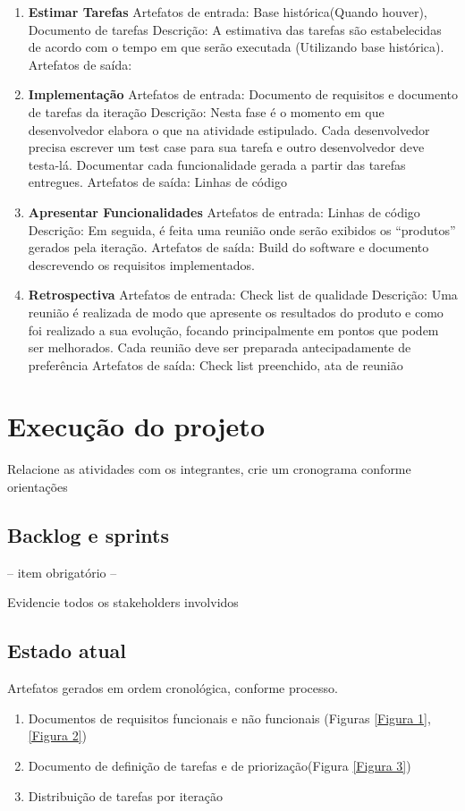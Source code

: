 \documentclass[	DIV=calc,%
							paper=a4,%
							fontsize=12pt,%
							onecolumn]{scrartcl}	 					%
\begin{document}
\begin{enumerate}
	\item \textbf{Estimar Tarefas}  
	\subitem Artefatos de entrada: Base histórica(Quando houver), Documento de tarefas
	\subitem Descrição: A estimativa das tarefas são estabelecidas de acordo com o tempo em que serão executada (Utilizando base histórica).
	\subitem Artefatos de saída: 
	
	\item \textbf{Implementação}
	\subitem Artefatos de entrada: Documento de requisitos e documento de tarefas da iteração 
	\subitem Descrição: Nesta fase é o momento em que desenvolvedor elabora o que na atividade estipulado. Cada desenvolvedor precisa escrever um test case para sua tarefa e outro desenvolvedor deve testa-lá. Documentar cada funcionalidade gerada a partir das tarefas entregues.
	\subitem Artefatos de saída: Linhas de código 
	
	\item \textbf{Apresentar Funcionalidades} 
	\subitem Artefatos de entrada: Linhas de código 
	\subitem Descrição: Em seguida, é feita uma reunião onde serão exibidos os “produtos” gerados pela iteração. 
	\subitem Artefatos de saída: Build do software e documento descrevendo os requisitos implementados. 

	\item \textbf{Retrospectiva} 
	\subitem Artefatos de entrada: Check list de qualidade 
	\subitem Descrição: Uma reunião é realizada de modo que apresente os resultados do produto e como foi realizado a sua evolução, focando principalmente em pontos que podem ser melhorados. Cada reunião deve ser preparada antecipadamente de preferência
	\subitem Artefatos de saída: Check list preenchido, ata de reunião
\end{enumerate}


\section{Execução do projeto}

Relacione as atividades com os integrantes, crie um cronograma conforme orientações
\subsection{Backlog e sprints}
-- item obrigatório --

Evidencie todos os stakeholders involvidos


\subsection{Estado atual}
Artefatos gerados em ordem cronológica, conforme processo. 
\begin{enumerate}
	\item Documentos de requisitos funcionais e não funcionais (Figuras \ref{Figura 1}, \ref{Figura 2})
	\item Documento de definição de tarefas e de priorização(Figura \ref{Figura 3})
	\item Distribuição de tarefas por iteração
\end{enumerate}
\end{document}
